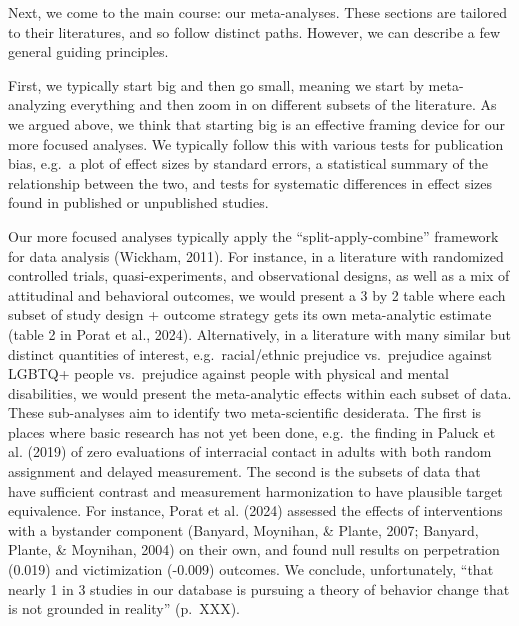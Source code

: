 \documentclass[
  ,jou]{apa6}
\begin{document}
Next, we come to the main course: our meta-analyses. These sections are tailored to their literatures, and so follow distinct paths. However, we can describe a few general guiding principles.

First, we typically start big and then go small, meaning we start by meta-analyzing everything and then zoom in on different subsets of the literature. As we argued above, we think that starting big is an effective framing device for our more focused analyses. We typically follow this with various tests for publication bias, e.g.~a plot of effect sizes by standard errors, a statistical summary of the relationship between the two, and tests for systematic differences in effect sizes found in published or unpublished studies.

Our more focused analyses typically apply the ``split-apply-combine'' framework for data analysis (Wickham, 2011). For instance, in a literature with randomized controlled trials, quasi-experiments, and observational designs, as well as a mix of attitudinal and behavioral outcomes, we would present a 3 by 2 table where each subset of study design + outcome strategy gets its own meta-analytic estimate (table 2 in Porat et al., 2024). Alternatively, in a literature with many similar but distinct quantities of interest, e.g.~racial/ethnic prejudice vs.~prejudice against LGBTQ+ people vs.~prejudice against people with physical and mental disabilities, we would present the meta-analytic effects within each subset of data. These sub-analyses aim to identify two meta-scientific desiderata. The first is places where basic research has not yet been done, e.g.~the finding in Paluck et al. (2019) of zero evaluations of interracial contact in adults with both random assignment and delayed measurement. The second is the subsets of data that have sufficient contrast and measurement harmonization to have plausible target equivalence. For instance, Porat et al. (2024) assessed the effects of interventions with a bystander component (Banyard, Moynihan, \& Plante, 2007; Banyard, Plante, \& Moynihan, 2004) on their own, and found null results on perpetration (0.019) and victimization (-0.009) outcomes. We conclude, unfortunately, ``that nearly 1 in 3 studies in our database is pursuing a theory of behavior change that is not grounded in reality'' (p.~XXX).
\end{document}
